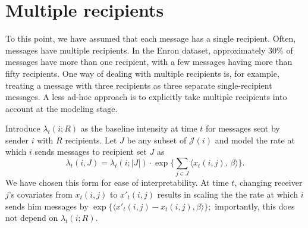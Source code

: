 \documentclass[aoas,preprint]{imsart}
\begin{document}
\clearpage

\section{Multiple recipients}

To this point, we have assumed that each message has a single recipient.
Often, messages have multiple recipients.  In the Enron dataset,
approximately 30\% of messages have more than one recipient, with
a few messages having more than fifty recipients.  One way of dealing
with multiple recipients is, for example, treating a message with three
recipients as three separate single-recipient messages.  A less ad-hoc
approach is to explicitly take multiple recipients into account at the
modeling stage.

Introduce $\lambda_t(i ; R)$ as the baseline intensity at time $t$ for
messages sent by sender $i$ with $R$ recipients.  Let $J$ be any
subset of $\mathcal{J}(i)$ and model the rate at which $i$ sends messages to
recipient set $J$ as
\begin{equation}\label{E:intensity-multiple}
    \lambda_t(i,J)
        =
        \lambda_t(i ; |J|)
        \cdot
        \exp\Big\{
            \sum_{j \in J}
                \langle x_t(i,j), \, \beta \rangle
        \Big\}.
\end{equation}
We have chosen this form for ease of interpretability.  At time
$t$, changing receiver $j$'s covariates from $x_t(i,j)$ to
$x'_t(i,j)$ results in scaling the the rate at
which $i$ sends him messages by
\(
    \exp\{ \langle x'_t(i,j) - x_t(i,j), \beta \rangle \};
\)
importantly, this does not depend on $\lambda_t(i; R)$.
\end{document}

